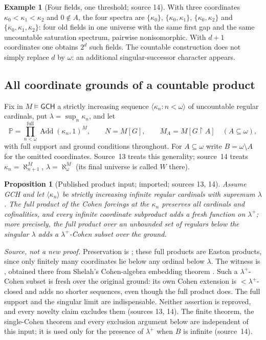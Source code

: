 \documentclass[11pt,letterpaper]{article}
\numberwithin{equation}{section}
\newtheorem{proposition}[proposition]{Proposition}
\theoremstyle{definition}
\newtheorem{example}[example]{Example}
\theoremstyle{remark}
\newcommand{\Add}{\operatorname{Add}}
\newcommand{\res}{\mathbin{\upharpoonright}}
\newcommand{\seq}[1]{\langle#1\rangle}
\newcommand{\GCH}{\mathsf{GCH}}
\begin{document}
\begin{example}[Four fields, one threshold; source 14]\label{univ:gs:ex:four}
With three coordinates $\kappa_0<\kappa_1<\kappa_2$ and $0\notin A$, the four spectra
are $\{\kappa_0\}$, $\{\kappa_0,\kappa_1\}$, $\{\kappa_0,\kappa_2\}$ and
$\{\kappa_0,\kappa_1,\kappa_2\}$: four old fields in one universe with the same first
gap and the same uncountable saturation spectrum, pairwise nonisomorphic. With $d+1$
coordinates one obtains $2^d$ such fields. The countable construction does not simply
replace $d$ by $\omega$: an additional singular-successor character appears.
\end{example}

\subsection{All coordinate grounds of a countable product}

Fix in $M\models\GCH$ a strictly increasing sequence $\seq{\kappa_n:n<\omega}$ of
uncountable regular cardinals, put $\lambda=\sup_n\kappa_n$, and let
\begin{equation}\label{univ:gs:eq:productsetup}
 \mathbb P=\prod^{\mathrm{full}}_{n<\omega}\Add(\kappa_n,1)^M,\qquad N=M[G],\qquad
 M_A=M[G\res A]\quad(A\subseteq\omega),
\end{equation}
with full support and ground conditions throughout. For $A\subseteq\omega$ write
$B=\omega\setminus A$ for the omitted coordinates. Source~13 treats this generality;
source~14 treats $\kappa_n=\aleph_{n+1}^M$, $\lambda=\aleph_\omega^M$ (its final universe
is called $W$ there).

\begin{proposition}[Published product input; imported; sources 13, 14]\label{univ:gs:prop:published}
Assume GCH and let $\seq{\kappa_n}$ be strictly increasing infinite regular cardinals
with supremum $\lambda$. The full product of the Cohen forcings at the $\kappa_n$
preserves all cardinals and cofinalities, and every infinite coordinate subproduct adds a
fresh function on $\lambda^+$; more precisely, the full product over an unbounded set of
regulars below the singular $\lambda$ adds a $\lambda^+$-Cohen subset over the ground.
\end{proposition}

\emph{Source, not a new proof.} Preservation is \cite[Proposition~4.10]{FKW}; these
full products are Easton products, since only finitely many coordinates lie below any
ordinal below $\lambda$. The witness is \cite[Corollary~4.21]{FKW}, obtained there from
Shelah's Cohen-algebra embedding theorem \cite{Shelah2000}. Such a $\lambda^+$-Cohen
subset is fresh over the original ground: its own Cohen extension is
$<\lambda^+$-closed and adds no shorter sequences, even though the full product does.
The full support and the singular limit are indispensable. Neither assertion is
reproved, and every novelty claim excludes them (sources 13, 14). The finite theorem,
the single-Cohen theorem and every exclusion argument below are independent of this
input; it is used only for the presence of $\lambda^+$ when $B$ is infinite
(source~14).
\end{document}
